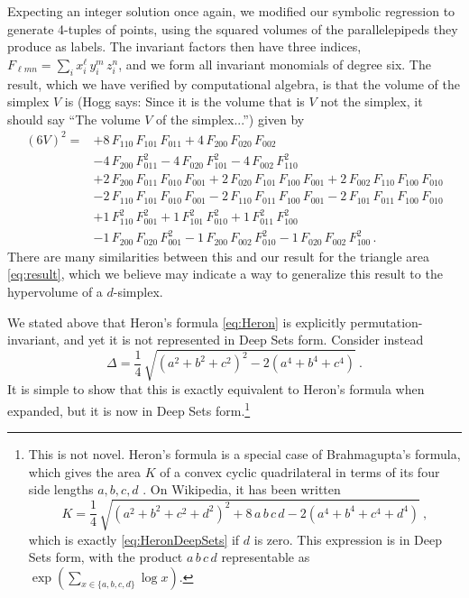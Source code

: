 \documentclass[12pt]{article}
\newcommand{\Hogg}[1]{{\color{violet} (Hogg says: #1)}}
\newcommand{\pseudosection}[1]
{}
\begin{document}
Expecting an integer solution once again, we modified our symbolic regression to generate 4-tuples of points, using the squared volumes of the parallelepipeds they produce as labels. 
The invariant factors then have three indices, $F_{\ell m n} = \sum_i x_i^\ell \, y_i^m \, z_i^n$, and we form all invariant monomials of degree six.
The result, which we have verified by computational algebra, is that the volume of the simplex $V$ is \Hogg{Since it is the volume that is $V$ not the simplex, it should say ``The volume $V$ of the simplex...''} given by
\begin{align}
(6 V)^2 = &
+8 \, F_{110} \, F_{101} \, F_{011}
+4 \, F_{200} \, F_{020} \, F_{002}
\nonumber \\ &
-4 \, F_{200} \, F_{011}^2
-4 \, F_{020} \, F_{101}^2
-4 \, F_{002} \, F_{110}^2
\nonumber \\ &
+2 \, F_{200} \, F_{011} \, F_{010} \, F_{001}
+2 \, F_{020} \, F_{101} \, F_{100} \, F_{001}
+2 \, F_{002} \, F_{110} \, F_{100} \, F_{010}
\nonumber \\ &
-2 \, F_{110} \, F_{101} \, F_{010} \, F_{001}
-2 \, F_{110} \, F_{011} \, F_{100} \, F_{001}
-2 \, F_{101} \, F_{011} \, F_{100} \, F_{010}
\nonumber \\ &
+1 \, F_{110}^2 \, F_{001}^2
+1 \, F_{101}^2 \, F_{010}^2
+1 \, F_{011}^2 \, F_{100}^2
\nonumber \\ &
-1 \, F_{200} \, F_{020} \, F_{001}^2
-1 \, F_{200} \, F_{002} \, F_{010}^2
-1 \, F_{020} \, F_{002} \, F_{100}^2 \, .
\label{eq:simplex}
\end{align}
There are many similarities between this and our result for the triangle area \eqref{eq:result}, which we believe may indicate a way to generalize this result to the hypervolume of a $d$-simplex.

\pseudosection{Generalizations: Heron symmetrized}

We stated above that Heron's formula \eqref{eq:Heron} is explicitly permutation-invariant, and yet it is not represented in Deep Sets form. Consider instead
\begin{equation}
\label{eq:HeronDeepSets}
    \Delta = \frac{1}{4} \, \sqrt{
        \left( a^2 + b^2 + c^2 \right)^2
        - 2 \left( a^4 + b^4 + c^4 \right)
    }~.
\end{equation}
It is simple to show that this is exactly equivalent to Heron's formula when expanded, but it is now in Deep Sets form.\footnote{
    This is not novel. Heron's formula is a special case of Brahmagupta's formula, which gives the area $K$ of a convex cyclic quadrilateral in terms of its four side lengths $a, b, c, d$ \citep{coolidge1939}.
    On Wikipedia, it has been written
    \begin{equation}
        K = \frac{1}{4} \, \sqrt{
            \left( a^2 + b^2 + c^2 + d^2 \right)^2
            + 8 \, a\,b\,c\,d
            - 2 \left( a^4 + b^4 + c^4 + d^4 \right)
        }~,
    \end{equation}
    which is exactly \eqref{eq:HeronDeepSets} if $d$ is zero.
    This expression is in Deep Sets form, with the product $a \, b \, c \, d$ 
    representable as $\exp( \sum_{x \in \{ a,b,c,d \}} \log x )$.
}
\end{document}
